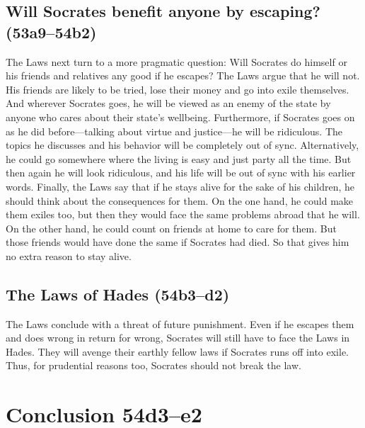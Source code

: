\documentclass[12pt,letterpaper]{article}
\begin{document}
\subsection*{Will Socrates benefit anyone by escaping? (53a9--54b2)}

The Laws next turn to a more pragmatic question: Will Socrates do himself or his friends and relatives any good if he escapes?
The Laws argue that he will not.
His friends are likely to be tried, lose their money and go into exile themselves.
And wherever Socrates goes, he will be viewed as an enemy of the state by anyone who cares about their state's wellbeing.
Furthermore, if Socrates goes on as he did before---talking about virtue and justice---he will be ridiculous.
The topics he discusses and his behavior will be completely out of sync.
Alternatively, he could go somewhere where the living is easy and just party all the time.
But then again he will look ridiculous, and his life will be out of sync with his earlier words.
Finally, the Laws say that if he stays alive for the sake of his children, he should think about the consequences for them.
On the one hand, he could make them exiles too, but then they would face the same problems abroad that he will.
On the other hand, he could count on friends at home to care for them.
But those friends would have done the same if Socrates had died.
So that gives him no extra reason to stay alive.

\subsection*{The Laws of Hades (54b3--d2)}

The Laws conclude with a threat of future punishment. Even if he escapes them and does wrong in return for wrong, Socrates will still have to face the Laws in Hades. They will avenge their earthly fellow laws if Socrates runs off into exile. Thus, for prudential reasons too, Socrates should not break the law.


\section*{Conclusion 54d3--e2}
\end{document}
